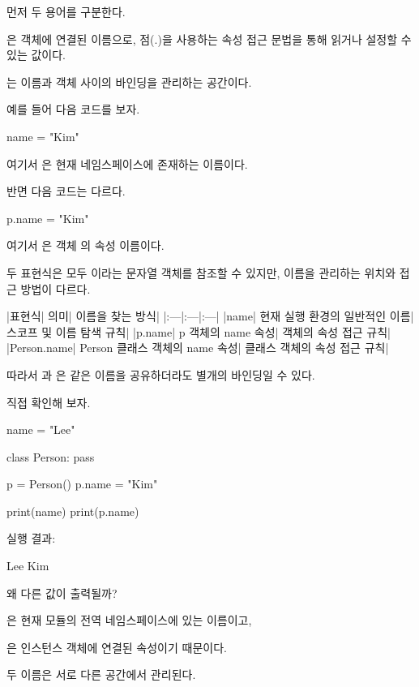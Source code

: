 먼저 두 용어를 구분한다.

은 객체에 연결된 이름으로, 점(.)을 사용하는 속성 접근 문법을 통해 읽거나 설정할 수 있는 값이다.

는 이름과 객체 사이의 바인딩을 관리하는 공간이다.

예를 들어 다음 코드를 보자.

\begin{dhkcode}
name = "Kim"
\end{dhkcode}

여기서 은 현재 네임스페이스에 존재하는 이름이다.

반면 다음 코드는 다르다.

\begin{dhkcode}
p.name = "Kim"
\end{dhkcode}

여기서 은 객체 의 속성 이름이다.

두 표현식은 모두 이라는 문자열 객체를 참조할 수 있지만, 이름을 관리하는 위치와 접근 방법이 다르다.

\begin{dhktable}
|표현식|	의미|	이름을 찾는 방식|
|:---|:---|:---|
|name|	현재 실행 환경의 일반적인 이름|	스코프 및 이름 탐색 규칙|
|p.name|	p 객체의 name 속성|	객체의 속성 접근 규칙|
|Person.name|	Person 클래스 객체의 name 속성|	클래스 객체의 속성 접근 규칙|
\end{dhktable}

따라서 과 은 같은 이름을 공유하더라도 별개의 바인딩일 수 있다.

직접 확인해 보자.

\begin{dhkcode}
name = "Lee"

class Person:
    pass

p = Person()
p.name = "Kim"

print(name)
print(p.name)
\end{dhkcode}

실행 결과:

\begin{dhkzsh}
Lee
Kim
\end{dhkzsh}

왜 다른 값이 출력될까?

은 현재 모듈의 전역 네임스페이스에 있는 이름이고,

은 인스턴스 객체에 연결된 속성이기 때문이다.

두 이름은 서로 다른 공간에서 관리된다.


